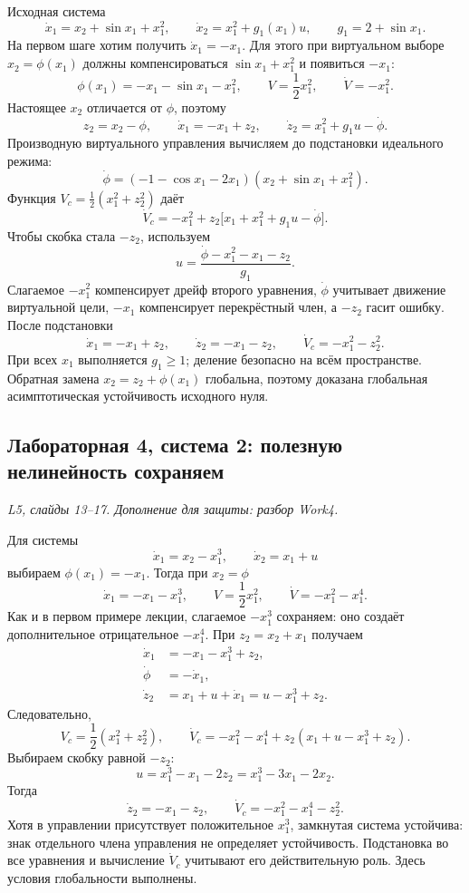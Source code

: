 Исходная система
\[
  \dot x_1=x_2+\sin x_1+x_1^2,\qquad
  \dot x_2=x_1^2+g_1(x_1)u,\qquad g_1=2+\sin x_1.
\]
На первом шаге хотим получить $\dot x_1=-x_1$. Для этого при
виртуальном выборе $x_2=\phi(x_1)$ должны компенсироваться
$\sin x_1+x_1^2$ и появиться $-x_1$:
\[
  \phi(x_1)=-x_1-\sin x_1-x_1^2,\qquad
  V=\frac12x_1^2,\qquad \dot V=-x_1^2.
\]
Настоящее $x_2$ отличается от $\phi$, поэтому
\[
  z_2=x_2-\phi,\qquad
  \dot x_1=-x_1+z_2,\qquad
  \dot z_2=x_1^2+g_1u-\dot\phi.
\]
Производную виртуального управления вычисляем до подстановки
идеального режима:
\[
  \dot\phi=(-1-\cos x_1-2x_1)
             (x_2+\sin x_1+x_1^2).
\]
Функция $V_c=\tfrac12(x_1^2+z_2^2)$ даёт
\[
  \dot V_c=-x_1^2+
     z_2\bigl[x_1+x_1^2+g_1u-\dot\phi\bigr].
\]
Чтобы скобка стала $-z_2$, используем
\[
  \boxed{u=\frac{\dot\phi-x_1^2-x_1-z_2}{g_1}}.
\]
Слагаемое $-x_1^2$ компенсирует дрейф второго уравнения,
$\dot\phi$ учитывает движение виртуальной цели,
$-x_1$ компенсирует перекрёстный член, а $-z_2$ гасит ошибку.
После подстановки
\[
  \dot x_1=-x_1+z_2,\qquad
  \dot z_2=-x_1-z_2,\qquad
  \dot V_c=-x_1^2-z_2^2.
\]
При всех $x_1$ выполняется $g_1\ge1$; деление безопасно на всём
пространстве. Обратная замена $x_2=z_2+\phi(x_1)$ глобальна,
поэтому доказана глобальная асимптотическая устойчивость исходного нуля.

\subsection{Лабораторная 4, система 2: полезную нелинейность сохраняем}
\textit{L5, слайды 13--17. Дополнение для защиты: разбор Work4.}

Для системы
\[
  \dot x_1=x_2-x_1^3,\qquad \dot x_2=x_1+u
\]
выбираем $\phi(x_1)=-x_1$. Тогда при $x_2=\phi$
\[
  \dot x_1=-x_1-x_1^3,\qquad
  V=\frac12x_1^2,\qquad \dot V=-x_1^2-x_1^4.
\]
Как и в первом примере лекции, слагаемое $-x_1^3$ сохраняем:
оно создаёт дополнительное отрицательное $-x_1^4$.
При $z_2=x_2+x_1$ получаем
\begin{align*}
  \dot x_1&=-x_1-x_1^3+z_2,\\
  \dot\phi&=-\dot x_1,\\
  \dot z_2&=x_1+u+\dot x_1=u-x_1^3+z_2.
\end{align*}
Следовательно,
\[
  V_c=\frac12(x_1^2+z_2^2),\qquad
  \dot V_c=-x_1^2-x_1^4+
          z_2(x_1+u-x_1^3+z_2).
\]
Выбираем скобку равной $-z_2$:
\[
  \boxed{u=x_1^3-x_1-2z_2=x_1^3-3x_1-2x_2}.
\]
Тогда
\[
  \dot z_2=-x_1-z_2,\qquad
  \dot V_c=-x_1^2-x_1^4-z_2^2.
\]
Хотя в управлении присутствует положительное $x_1^3$, замкнутая
система устойчива: знак отдельного члена управления не определяет
устойчивость. Подстановка во все уравнения и вычисление $\dot V_c$
учитывают его действительную роль. Здесь условия глобальности выполнены.

